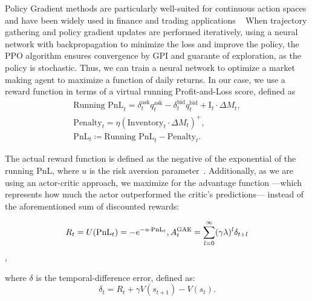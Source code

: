 \documentclass[11pt]{article}
\begin{document}
    Policy Gradient methods are particularly well-suited for continuous action spaces and have been widely used in finance and trading applications
    ~\citep{Guo2023, Gasperov2022}
    When trajectory gathering and policy gradient updates are performed iteratively, 
    using a neural network with backpropagation to minimize the loss and improve the policy, 
    the PPO algorithm ensures convergence by GPI and guarante of exploration, as the policy is stochastic.
    Thus, we can train a neural network to optimize a market making agent to maximize a function of daily returns.
    In our case, we use a reward function in terms of a virtual running Profit-and-Loss score, defined as
    \begin{equation}
        \begin{aligned}
            \text{Running PnL}_t = \delta_t^{\text{ask}} q_t^{\text{ask}} - \delta_t^{\text{bid}} q_t^{\text{bid}} + \text{I}_t \cdot \Delta M_t, \\
            \text{Penalty}_t = \eta \left( \text{Inventory}_t \cdot \Delta M_t \right)^+,\\
            \text{PnL}_t \coloneqq \text{Running PnL}_t - \text{Penalty}_t .
        \end{aligned}
        \label{eq:pnl}
    \end{equation}

    The actual reward function is defined as the negative of the exponential of the running PnL, 
    where $u$ is the risk aversion parameter~\citep{Gueant2022, FalcesMarin2022}.
    Additionally, as we are using an actor-critic approach, 
    we maximize for the advantage function ---which represents how much the actor
    outperformed the critic's predictions--- instead of the aforementioned sum of discounted rewards:
    
    \begin{equation}
        R_t = U(\text{PnL}_t) = -e^{-u \cdot \text{PnL}_t},\\
        A^{\text{GAE}}_t = \sum_{l=0}^{\infty} (\gamma \lambda)^l \delta_{t+l}
        \label{eq:reward}
    \end{equation},

    where $\delta$ is the temporal-difference error, defined as:
    \begin{equation}
        \delta_t = R_t + \gamma V(s_{t+1}) - V(s_t).
        \label{eq:td}
    \end{equation}
\end{document}
